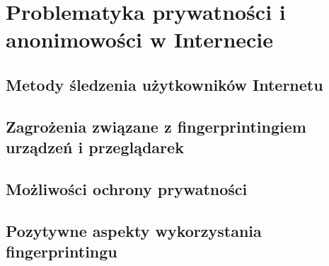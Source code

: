 \chapter{Problematyka prywatności i anonimowości w Internecie}

\section{Metody śledzenia użytkowników Internetu}

\section{Zagrożenia związane z fingerprintingiem urządzeń i przeglądarek}

\section{Możliwości ochrony prywatności}

\section{Pozytywne aspekty wykorzystania fingerprintingu}
